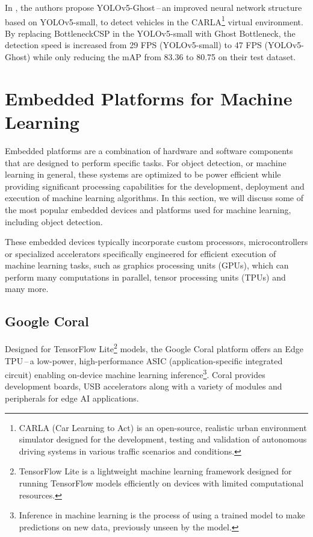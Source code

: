 In \cite{Wu2021}, the authors propose YOLOv5-Ghost\,--\,an improved neural
network structure based on YOLOv5-small, to detect vehicles in the
CARLA\footnote{CARLA (Car Learning to Act) is an open-source, realistic urban
environment simulator designed for the development, testing and validation of
autonomous driving systems in various traffic scenarios and conditions.} virtual
environment. By replacing BottleneckCSP in the YOLOv5-small with Ghost
Bottleneck, the detection speed is increased from 29 FPS (YOLOv5-small) to 47
FPS (YOLOv5-Ghost) while only reducing the mAP from \num{83.36} to \num{80.75}
on their test dataset.














\section{Embedded Platforms for Machine Learning}

Embedded platforms are a combination of hardware and software components that
are designed to perform specific tasks. For object detection, or machine
learning in general, these systems are optimized to be power efficient while
providing significant processing capabilities for the development, deployment and
execution of machine learning algorithms. In this section, we will discuss some
of the most popular embedded devices and platforms used for machine learning,
including object detection.

These embedded devices typically incorporate custom processors, microcontrollers
or specialized accelerators specifically engineered for efficient execution of
machine learning tasks, such as graphics processing units (GPUs), which can
perform many computations in parallel, tensor processing units (TPUs) and many
more.

\subsection{Google Coral}

Designed for TensorFlow Lite\footnote{TensorFlow Lite is a lightweight machine
learning framework designed for running TensorFlow models efficiently on devices
with limited computational resources.} models, the Google Coral platform offers
an Edge TPU\,--\,a low-power, high-performance ASIC (application-specific
integrated circuit) enabling on-device machine learning
inference\footnote{Inference in machine learning is the process of using a
trained model to make predictions on new data, previously unseen by the model.}.
Coral provides development boards, USB accelerators along with a variety of
modules and peripherals for edge AI applications.


